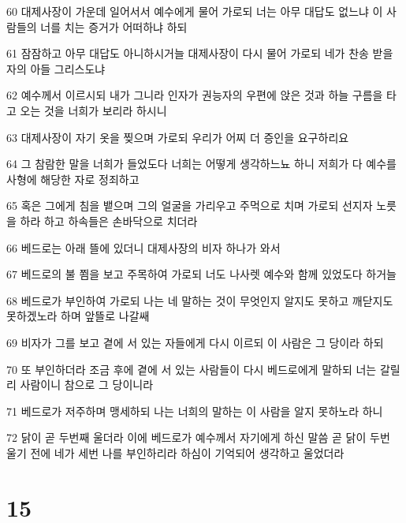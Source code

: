 \par 60 대제사장이 가운데 일어서서 예수에게 물어 가로되 너는 아무 대답도 없느냐 이 사람들의 너를 치는 증거가 어떠하냐 하되
\par 61 잠잠하고 아무 대답도 아니하시거늘 대제사장이 다시 물어 가로되 네가 찬송 받을 자의 아들 그리스도냐
\par 62 예수께서 이르시되 내가 그니라 인자가 권능자의 우편에 앉은 것과 하늘 구름을 타고 오는 것을 너희가 보리라 하시니
\par 63 대제사장이 자기 옷을 찢으며 가로되 우리가 어찌 더 증인을 요구하리요
\par 64 그 참람한 말을 너희가 들었도다 너희는 어떻게 생각하느뇨 하니 저희가 다 예수를 사형에 해당한 자로 정죄하고
\par 65 혹은 그에게 침을 뱉으며 그의 얼굴을 가리우고 주먹으로 치며 가로되 선지자 노릇을 하라 하고 하속들은 손바닥으로 치더라
\par 66 베드로는 아래 뜰에 있더니 대제사장의 비자 하나가 와서
\par 67 베드로의 불 쬠을 보고 주목하여 가로되 너도 나사렛 예수와 함께 있었도다 하거늘
\par 68 베드로가 부인하여 가로되 나는 네 말하는 것이 무엇인지 알지도 못하고 깨닫지도 못하겠노라 하며 앞뜰로 나갈쌔
\par 69 비자가 그를 보고 곁에 서 있는 자들에게 다시 이르되 이 사람은 그 당이라 하되
\par 70 또 부인하더라 조금 후에 곁에 서 있는 사람들이 다시 베드로에게 말하되 너는 갈릴리 사람이니 참으로 그 당이니라
\par 71 베드로가 저주하며 맹세하되 나는 너희의 말하는 이 사람을 알지 못하노라 하니
\par 72 닭이 곧 두번째 울더라 이에 베드로가 예수께서 자기에게 하신 말씀 곧 닭이 두번 울기 전에 네가 세번 나를 부인하리라 하심이 기억되어 생각하고 울었더라

\chapter{15}

